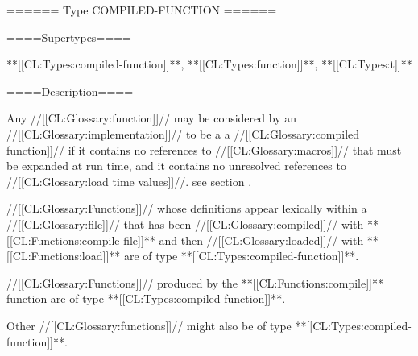 ====== Type COMPILED-FUNCTION ======

====Supertypes====

**[[CL:Types:compiled-function]]**, **[[CL:Types:function]]**, **[[CL:Types:t]]**

====Description====

Any //[[CL:Glossary:function]]// may be considered by an //[[CL:Glossary:implementation]]// to be a a //[[CL:Glossary:compiled function]]// if it contains no references to //[[CL:Glossary:macros]]// that must be expanded at run time, and it contains no unresolved references to //[[CL:Glossary:load time values]]//. see section {\secref\CompilationSemantics}.

//[[CL:Glossary:Functions]]// whose definitions appear lexically within a //[[CL:Glossary:file]]// that has been //[[CL:Glossary:compiled]]// with **[[CL:Functions:compile-file]]** and then //[[CL:Glossary:loaded]]// with **[[CL:Functions:load]]** are of type **[[CL:Types:compiled-function]]**.

//[[CL:Glossary:Functions]]// produced by the **[[CL:Functions:compile]]** function are of type **[[CL:Types:compiled-function]]**.

Other //[[CL:Glossary:functions]]// might also be of type **[[CL:Types:compiled-function]]**.

  
